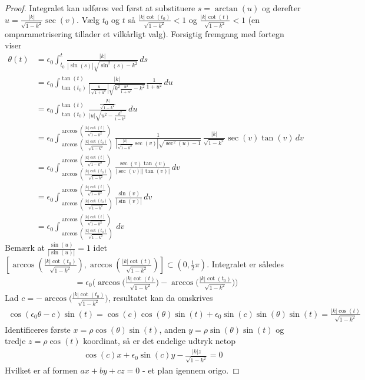 \documentclass[12pt]{article}
\begin{document}
\begin{proof}
\newpage
\noindent Integralet kan udføres ved først at substituere $s=\arctan(u)$ og derefter $u=\frac{|k|}{\sqrt{1-k^2}}\sec(v)$. Vælg $t_0$ og $t$ så $\frac{|k|\cot(t_0)}{\sqrt{1-k^2}}<1$ og $\frac{|k|\cot(t)}{\sqrt{1-k^2}}<1$ (en omparametrisering tillader et vilkårligt valg). Forsigtig fremgang med fortegn viser
\begin{align*}
\theta(t) &= \epsilon_0 \int_{t_0}^t \frac{|k|}{|\sin(s)|\sqrt{\sin^2(s)-k^2}} \, ds \\
&=
\epsilon_0 \int^{\tan(t)}_{\tan(t_0)} \frac{|k|}{|\frac{u}{\sqrt{1+u^2}}|\sqrt{k^2 \frac{u^2}{1+u^2}-k^2}} \frac{1}{1+u^2}\, du \\
&=
\epsilon_0 \int^{\tan(t)}_{\tan(t_0)} \frac{\frac{|k|}{\sqrt{1-k^2}}}{|u|\sqrt{u^2 -\frac{k^2}{1-k^2}}}\, du \\
&=
\epsilon_0 \int^{\arccos(\frac{|k|\cot(t)}{\sqrt{1-k^2}})}_{\arccos(\frac{|k|\cot(t_0)}{\sqrt{1-k^2}})} \frac{1}{|\frac{|k|}{\sqrt{1-k^2}}\sec(v)|\sqrt{\sec^2(u) - 1}}\, \frac{|k|}{\sqrt{1-k^2}}\sec(v)\tan(v)\, dv \\
&=
\epsilon_0 \int^{\arccos(\frac{|k|\cot(t)}{\sqrt{1-k^2}})}_{\arccos(\frac{|k|\cot(t_0)}{\sqrt{1-k^2}})} \frac{\sec(v)\tan(v)}{|\sec(v)||\tan(v)|} \, dv \\
&=
\epsilon_0 \int^{\arccos(\frac{|k|\cot(t)}{\sqrt{1-k^2}})}_{\arccos(\frac{|k|\cot(t_0)}{\sqrt{1-k^2}})} \frac{\sin(v)}{|\sin(v)|} \, dv \\
&=
\epsilon_0 \int^{\arccos(\frac{|k|\cot(t)}{\sqrt{1-k^2}})}_{\arccos(\frac{|k|\cot(t_0)}{\sqrt{1-k^2}})} \, dv
\end{align*}
Bemærk at $\frac{\sin(u)}{|\sin(u)|}=1$ idet $[\arccos(\frac{|k|\cot(t_0)}{\sqrt{1-k^2}}),\arccos(\frac{|k|\cot(t)}{\sqrt{1-k^2}})] \subset (0,\frac{1}{2}\pi)$. Integralet er således
\begin{align*}
&=
\epsilon_0 \Big(\arccos\big(\frac{|k|\cot(t)}{\sqrt{1-k^2}}\big) - \arccos\big(\frac{|k|\cot(t_0)}{\sqrt{1-k^2}}\big)\Big)
\end{align*}
Lad $c=- \arccos\big(\frac{|k|\cot(t_0)}{\sqrt{1-k^2}}\big)$, resultatet kan da omskrives  
\begin{align*}
\cos (\epsilon_0\theta - c)\sin(t) = \cos (c)\cos(\theta)\sin(t)+\epsilon_0 \sin(c)\sin(\theta) \sin(t) =
\frac{|k|\cos(t)}{\sqrt{1-k^2}} 
\end{align*}
Identificeres første $x=\rho\cos(\theta)\sin(t)$, anden $y=\rho\sin(\theta)\sin(t)$ og tredje $z=\rho\cos(t)$ koordinat, så er det endelige udtryk netop 
\begin{align*}
\cos (c)x+\epsilon_0\sin(c)y - \frac{|k|z}{\sqrt{1-k^2}}=0 
\end{align*}
Hvilket er af formen $ax+by+cz=0$ - et plan igennem origo.
\end{proof}
\end{document}
